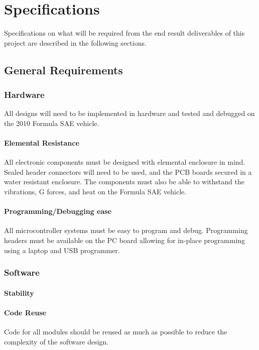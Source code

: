 %
%
%
%

\section{Specifications}

Specifications on what will be required from the end result deliverables of this project are described in the following sections.

\subsection{General Requirements}

\subsubsection{Hardware}

All designs will need to be implemented in hardware and tested and debugged on the 2010 Formula SAE vehicle.

\paragraph{Elemental Resistance}
All electronic components must be designed with elemental enclosure in mind. Sealed header connectors will need to be used, and the PCB boards secured in a water resistant enclosure. The components must also be able to withstand the vibrations, G forces, and heat on the Formula SAE vehicle.

\paragraph{Programming/Debugging ease}
All microcontroller systems must be easy to program and debug. Programming headers must be available on the PC board allowing for in-place programming using a laptop and USB programmer.

\subsubsection{Software}

\paragraph{Stability}

\paragraph{Code Reuse}
Code for all modules should be reused as much as possible to reduce the complexity of the software design.

